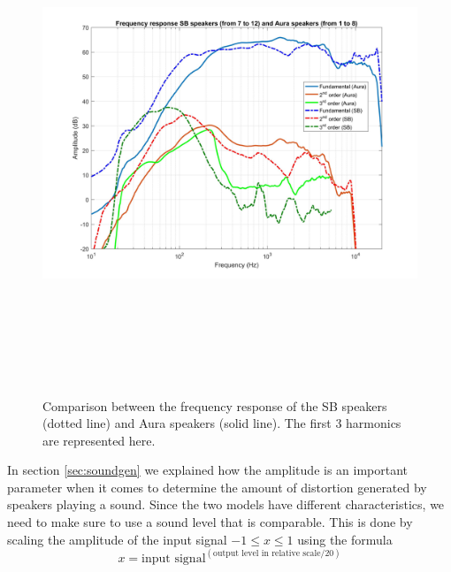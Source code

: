 \begin{figure}[H]
\centering
\includegraphics[width=15cm,height=15cm,keepaspectratio]{Figures/aurasbfreq}
\decoRule
\caption[Anechoic chamber]{Comparison between the frequency response of the SB speakers (dotted line) and Aura speakers (solid line). The first 3 harmonics are represented here.}
\label{fig:aurasbfreq}
\end{figure}

In section \ref{sec:soundgen} we explained how the amplitude is an important parameter when it comes to determine the amount of distortion generated by speakers playing a sound. Since the two models have different characteristics, we need to make sure to use a sound level that is comparable. This is done by scaling the amplitude of the input signal $-1\le x\le 1$ using the formula
\[x=\text{input signal}^{(\text{output level in relative scale}/20)}\]

